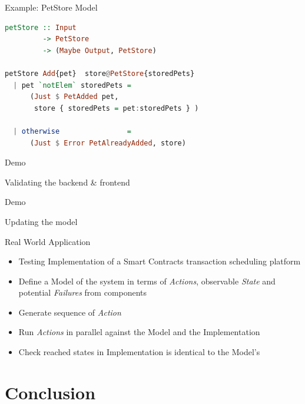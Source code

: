 \begin{frame}[fragile]{Example: PetStore Model}
\begin{lstlisting}[language=Haskell,basicstyle=\ttfamily,keywordstyle=\color{red}]
petStore :: Input
         -> PetStore
         -> (Maybe Output, PetStore)

petStore Add{pet}  store@PetStore{storedPets}
  | pet `notElem` storedPets =
      (Just $ PetAdded pet,
       store { storedPets = pet:storedPets } )

  | otherwise                =
      (Just $ Error PetAlreadyAdded, store)
\end{lstlisting}
\end{frame}

\begin{frame}[fragile]{Demo}
  \begin{center}
    \Huge{Validating the backend \& frontend}
  \end{center}
\end{frame}

\begin{frame}[fragile]{Demo}
  \begin{center}
    \Huge{Updating the model}
  \end{center}
\end{frame}

\begin{frame}[fragile]{Real World Application}
  \begin{itemize}[<+->]
  \item Testing Implementation of a Smart Contracts transaction scheduling platform
  \item Define a Model of the system in terms of \emph{Actions}, observable \emph{State} and potential \emph{Failures} from components
  \item Generate sequence of \emph{Action}
  \item Run \emph{Actions} in parallel against the Model and the Implementation
  \item Check reached states in Implementation is identical to the Model's
  \end{itemize}
\end{frame}


\part{Conclusion}

